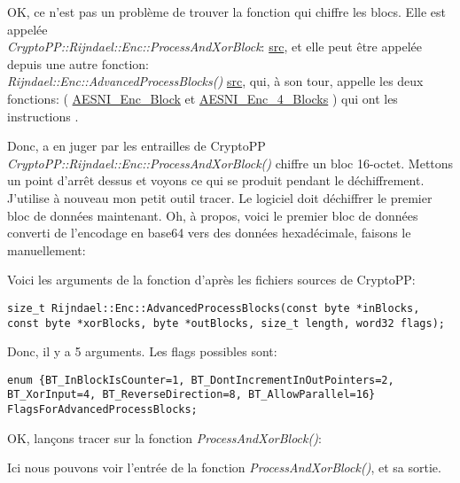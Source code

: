 OK, ce n'est pas un problème de trouver la fonction qui chiffre les blocs.
Elle est appelée \\
\emph{CryptoPP::Rijndael::Enc::ProcessAndXorBlock}:
\href{https://github.com/mmoss/cryptopp/blob/2772f7b57182b31a41659b48d5f35a7b6cedd34d/src/rijndael.cpp#L349}{src},
et elle peut être appelée depuis une autre fonction: \\
\emph{Rijndael::Enc::AdvancedProcessBlocks()}
\href{https://github.com/mmoss/cryptopp/blob/2772f7b57182b31a41659b48d5f35a7b6cedd34d/src/rijndael.cpp#L1179}{src},
qui, à son tour, appelle les deux fonctions: (
\href{https://github.com/mmoss/cryptopp/blob/2772f7b57182b31a41659b48d5f35a7b6cedd34d/src/rijndael.cpp#L1000}{AESNI\_Enc\_Block}
et
\href{https://github.com/mmoss/cryptopp/blob/2772f7b57182b31a41659b48d5f35a7b6cedd34d/src/rijndael.cpp#L1012}{AESNI\_Enc\_4\_Blocks}
)
qui ont les instructions  .

Donc, a en juger par les entrailles de CryptoPP \\
\emph{CryptoPP::Rijndael::Enc::ProcessAndXorBlock()} chiffre un bloc 16-octet.
Mettons un point d'arrêt dessus et voyons ce qui se produit pendant le déchiffrement.
J'utilise à nouveau mon petit outil tracer.
Le logiciel doit déchiffrer le premier bloc de données maintenant.
Oh, à propos, voici le premier bloc de données converti de l'encodage en base64 vers
des données hexadécimale, faisons le manuellement:



Voici les arguments de la fonction d'après les fichiers sources de CryptoPP:

\begin{lstlisting}
size_t Rijndael::Enc::AdvancedProcessBlocks(const byte *inBlocks, const byte *xorBlocks, byte *outBlocks, size_t length, word32 flags);
\end{lstlisting}

Donc, il y a 5 arguments. Les flags possibles sont:

\begin{lstlisting}
enum {BT_InBlockIsCounter=1, BT_DontIncrementInOutPointers=2, BT_XorInput=4, BT_ReverseDirection=8, BT_AllowParallel=16} FlagsForAdvancedProcessBlocks;
\end{lstlisting}

OK, lançons tracer sur la fonction \emph{ProcessAndXorBlock()}:



Ici nous pouvons voir l'entrée de la fonction \emph{ProcessAndXorBlock()}, et sa sortie.


